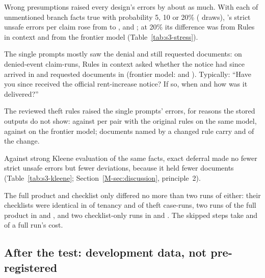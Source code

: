 Wrong presumptions raised every design's errors by about as much. With each of \sthreeRFourAbsentFacts{} unmentioned branch facts true with probability 5, 10 or 20\% (\sthreeRDraws{} draws), \casepath's strict unsafe errors per claim rose from \sthreeHTwoA{} to \sthreeRFourFiveCasePath, \sthreeRFourTenCasePath{} and \sthreeRFourTwentyCasePath; at 20\% its difference was \sthreeRFourTwentyDiffRic{} from Rules in context and \sthreeRFourTwentyDiffRicFrontier{} from the frontier model (Table~\ref{tab:s3-stress}).

The single prompts mostly saw the denial and still requested documents: on \sthreeREightRicRuns{} denied-event claim-runs, Rules in context asked whether the notice had since arrived in \sthreeREightRicAck{} and requested documents in \sthreeREightRicRequests{} (frontier model: \sthreeREightRicFrontierAck{} and \sthreeREightRicFrontierRequests). Typically: ``Have you since received the official rent-increase notice? If so, when and how was it delivered?''

The reviewed theft rules raised the single prompts' errors, for reasons the stored outputs do not show: \sthreeRNineLunaErrReviewed{} against \sthreeRNineLunaErrOriginal{} per pair with the original rules on the same model, \sthreeRNineTerraErrReviewed{} against \sthreeRNineTerraErrOriginal{} on the frontier model; documents named by a changed rule carry \sthreeRNineLunaShareChangedRules{} and \sthreeRNineTerraShareChangedRules{} of the change.

Against strong Kleene evaluation of the same facts, exact deferral made no fewer strict unsafe errors but fewer deviations, because it held fewer documents (Table~\ref{tab:s3-kleene}; Section~\ref{M-sec:discussion}, principle~2).

The full product and checklist only differed no more than two runs of either: their checklists were identical in \sthreeRSevenTenIdenticalShare{} of tenancy and \sthreeRSevenThIdenticalShare{} of theft case-runs, two runs of the full product in \sthreeRSevenBTenCasePathIdenticalShare{} and \sthreeRSevenBThCasePathIdenticalShare, and two checklist-only runs in \sthreeRSevenBTenChecklistIdenticalShare{} and \sthreeRSevenBThChecklistIdenticalShare. The skipped steps take \sthreeRSevenTenNotCalledShare{} and \sthreeRSevenThNotCalledShare{} of a full run's cost.

\subsection{After the test: development data, not pre-registered}
\label{sec:test-after}

